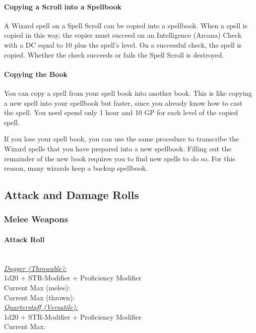 \documentclass[letterpaper,openany,oneside,twocolumn]{book}
\begin{document}
\paragraph*{Copying a Scroll into a Spellbook} A Wizard spell on a Spell Scroll can be copied into a spellbook. When a spell is copied in this way, the copier must succeed on an Intelligence (Arcana) Check with a DC equal to 10 plus the spell's level. On a successful check, the spell is copied. Whether the check succeeds or fails the Spell Scroll is destroyed.
\paragraph*{Copying the Book} You can copy a spell from your spell book into another book. This is like copying a new spell into your spellbook but faster, since you already know how to cast the spell. You need spend only 1 hour and 10 GP for each level of the copied spell.

If you lose your spell book, you can use the same procedure to transcribe the Wizard spells that you have prepared into a new spellbook. Filling out the remainder of the new book requires you to find new spells to do so. For this reason, many wizards keep a backup spellbook. 

\vfill\eject

\subsection*{Attack and Damage Rolls}
\subsubsection*{Melee Weapons}
\paragraph*{Attack Roll}\hfill\\
\underline{\textit{Dagger (Throwable):}}\\
1d20 + STR-Modifier + Proficiency Modifier\\
\indent Current Max (melee): \\
\indent Current Max (thrown): 
\\
\underline{\textit{Quarterstaff (Versatile):}}\\
1d20 + STR-Modifier + Proficiency Modifier\\
\indent Current Max: 
\end{document}
